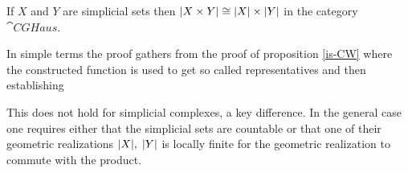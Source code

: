 \documentclass[../../main.tex]{subfiles}
\begin{document}
    \begin{proposition}
        If $X$ and $Y$ are simplicial sets then $\geom[X\times Y]\cong \geom[X]\times \geom[Y]$ in the category $\cat{CGHaus}$.
    \end{proposition}

    In simple terms the proof gathers from the proof of proposition \ref{is-CW} where the constructed function is used to get so called representatives and then establishing 

    This does not hold for simplicial complexes, a key difference. In the general case one requires either that the simplicial sets are countable or that one of their geometric realizations $\geom[X],\; \geom[Y]$ is locally finite for the geometric realization to commute with the product. 
\end{document}

